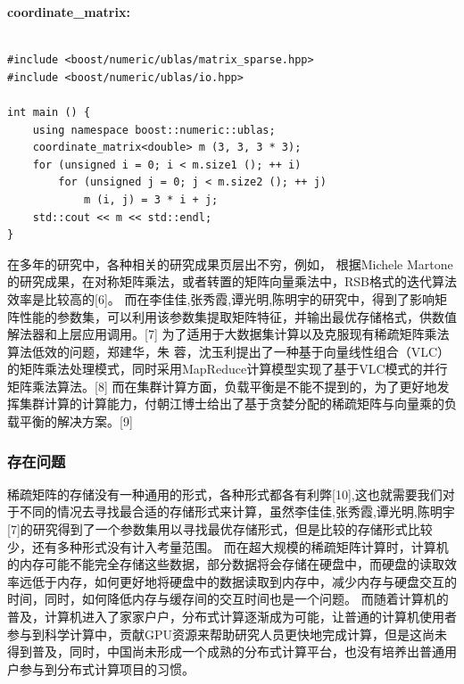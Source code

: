 \documentclass{article}
\begin{document}
\textbf{coordinate\_matrix:}
\begin{lstlisting}

#include <boost/numeric/ublas/matrix_sparse.hpp>
#include <boost/numeric/ublas/io.hpp>

int main () {
    using namespace boost::numeric::ublas;
    coordinate_matrix<double> m (3, 3, 3 * 3);
    for (unsigned i = 0; i < m.size1 (); ++ i)
        for (unsigned j = 0; j < m.size2 (); ++ j)
            m (i, j) = 3 * i + j;
    std::cout << m << std::endl;
}
\end{lstlisting}

在多年的研究中，各种相关的研究成果页层出不穷，例如，
根据Michele Martone的研究成果，在对称矩阵乘法，或者转置的矩阵向量乘法中，RSB格式的迭代算法效率是比较高的[6]。
而在李佳佳,张秀霞,谭光明,陈明宇的研究中，得到了影响矩阵性能的参数集，可以利用该参数集提取矩阵特征，并输出最优存储格式，供数值解法器和上层应用调用。[7]
为了适用于大数据集计算以及克服现有稀疏矩阵乘法算法低效的问题，郑建华，朱 蓉，沈玉利提出了一种基于向量线性组合（VLC）的矩阵乘法处理模式，同时采用MapReduce计算模型实现了基于VLC模式的并行矩阵乘法算法。[8]
而在集群计算方面，负载平衡是不能不提到的，为了更好地发挥集群计算的计算能力，付朝江博士给出了基于贪婪分配的稀疏矩阵与向量乘的负载平衡的解决方案。[9]
\newline

\subsubsection{存在问题}

稀疏矩阵的存储没有一种通用的形式，各种形式都各有利弊[10],这也就需要我们对于不同的情况去寻找最合适的存储形式来计算，虽然李佳佳,张秀霞,谭光明,陈明宇[7]的研究得到了一个参数集用以寻找最优存储形式，但是比较的存储形式比较少，还有多种形式没有计入考量范围。
\newline
而在超大规模的稀疏矩阵计算时，计算机的内存可能不能完全存储这些数据，部分数据将会存储在硬盘中，而硬盘的读取效率远低于内存，如何更好地将硬盘中的数据读取到内存中，减少内存与硬盘交互的时间，同时，如何降低内存与缓存间的交互时间也是一个问题。
\newline
而随着计算机的普及，计算机进入了家家户户，分布式计算逐渐成为可能，让普通的计算机使用者参与到科学计算中，贡献GPU资源来帮助研究人员更快地完成计算，但是这尚未得到普及，同时，中国尚未形成一个成熟的分布式计算平台，也没有培养出普通用户参与到分布式计算项目的习惯。\newline
\end{document}
